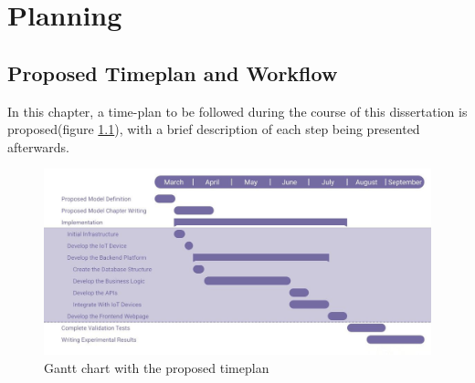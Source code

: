
%

\chapter{Planning}
\label{cha:Planning}

\section{Proposed Timeplan and Workflow}
In this chapter, a time-plan to be followed during the course of this
dissertation is proposed(figure \ref{fig:timeplan}), with a brief description
of each step being presented afterwards.

\begin{figure}[htbp]
	\centering
	\includegraphics[width=\textwidth]{Chapters/Figures/Planning/Planning.jpeg}
	\caption{Gantt chart with the proposed timeplan}
	\label{fig:timeplan}
\end{figure}

